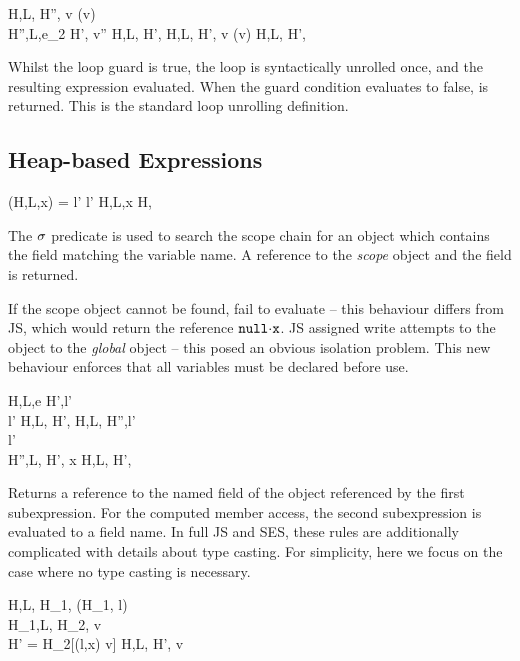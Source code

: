 \documentclass[a4paper,notitlepage]{report}
\begin{document}
  {H,L, \gevalsto H'', v \quad \istrue(v) \\
   H'',L,e_2 \evalsto H', v''}
  {H,L, \evalsto H',\und}
\qquad
  {H,L, \gevalsto H', v \quad \isfalse(v)}
  {H,L, \evalsto H',\und}

  Whilst the loop guard is true, the loop is syntactically unrolled once, and
  the resulting expression evaluated. When the guard condition evaluates to
  false, \und is returned. This is the standard loop unrolling definition.

  \subsection{Heap-based Expressions}
    {\scope(H,L,x) = l' \quad l' \neq \nil}
    {H,L,\js x \evalsto H, }

  The $\sigma$ predicate is used to search the scope chain for an object which
  contains the field matching the variable name. A reference to the \emph{scope}
  object and the field is returned.

  If the scope object cannot be found, fail to evaluate -- this
  behaviour differs from JS, which would return the reference
  $\fld{\nil}{\js{x}}$.  JS assigned write attempts to the \nil object to the
  \emph{global} object -- this posed an obvious isolation problem.
  This new behaviour enforces that all variables must be declared before use.

  {H,L,\js e \gevalsto H',l' \\
   l' \neq \nil}
  {H,L, \evalsto H', }
\qquad
  {H,L, \gevalsto H'',l' \\
   l' \neq \nil \\
   H'',L, \evalsto H', x}
  {H,L, \evalsto H',}

  Returns a reference to the named field of the object referenced by the first
  subexpression. For the computed member access, the second subexpression is
  evaluated to a field name. In full JS and SES, these rules are additionally
  complicated with details about type casting. For simplicity, here we focus on
  the case where no type casting is necessary.

  {H,L, \evalsto H_1, \qquad
   \ReadWrite(H_1, l) \\
   H_1,L, \gevalsto H_2, v \\
   H' = H_2[(l,x) \pointsto v]}
  {H,L, \evalsto H', v}
\end{document}
